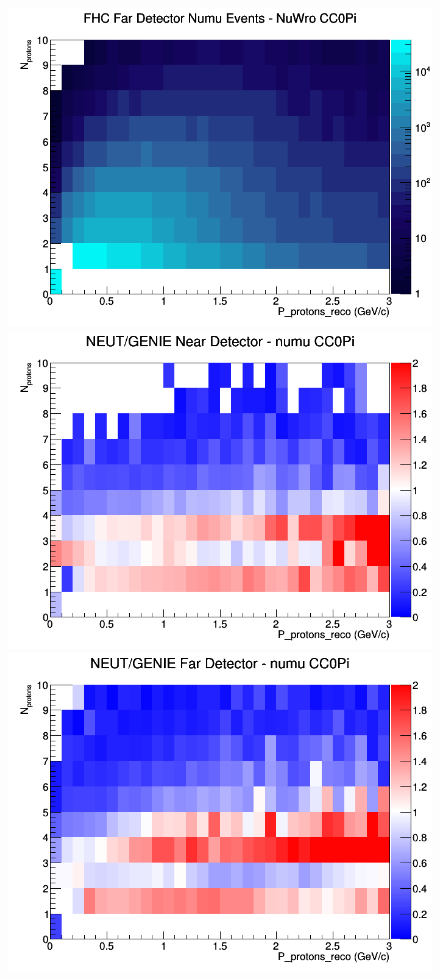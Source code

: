 \begin{figure}[h]
\endminipage
{}
\includegraphics[width=\linewidth]{eff_N_P/FGT/protons/CC0Pi_FHC_FD_numu_N_P_NuWro.png}
\endminipage
\newline
{}
\includegraphics[width=\linewidth]{eff_N_P/FGT/protons/ratios/CC0Pi_NEUT_GENIE_numu_near_N_P.png}
\endminipage
{}
\includegraphics[width=\linewidth]{eff_N_P/FGT/protons/ratios/CC0Pi_NEUT_GENIE_numu_far_N_P.png}

\end{figure}
